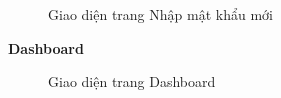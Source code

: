 \begin{figure}[H]
    \begin{center}
        \caption{Giao diện trang Nhập mật khẩu mới}
        \label{result_quen_mat_khau_new_password}
    \end{center}
\end{figure}


\textbf{Dashboard}

\begin{figure}[H]
    \begin{center}
        \caption{Giao diện trang Dashboard}
        \label{result_dashboard}
    \end{center}
\end{figure}

